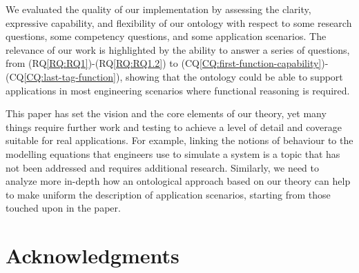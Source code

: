 \documentclass[sw]{iosart2x}
\newcommand{\CQLabel}{\textrm{CQ}}
\newcommand{\RQLabel}{\textrm{RQ}}
\newcommand{\refCQ}[1]{({\CQLabel}\ref{#1})}
\newcommand{\refRQ}[1]{({\RQLabel}\ref{#1})}
\newcommand{\TODO}[1]{{%
}}
\begin{document}
We evaluated the quality of our implementation by assessing the clarity, expressive capability, and flexibility of our ontology with respect to some research questions, some competency questions, and some application scenarios. 
The relevance of our work is highlighted by the ability to answer a series of questions, from \refRQ{RQ:RQ1}-\refRQ{RQ:RQ1.2} to \refCQ{CQ:first-function-capability}-\refCQ{CQ:last-tag-function}, showing that the ontology could be able to support applications in most engineering scenarios where functional reasoning is required. 

This paper has set the vision and the core elements of our theory, yet many things require further work and testing to achieve a  level of detail and coverage suitable for real applications.
For example, linking the notions of behaviour to the modelling equations that engineers use to simulate a system is a topic that has not been addressed and requires additional research. Similarly, we need to analyze more in-depth how an ontological approach based on our theory can help to make uniform the description of application scenarios, starting from those touched upon in the paper.





\section*{Acknowledgments}

\end{document}
